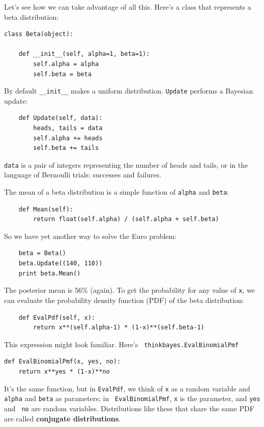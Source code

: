 \documentclass[12pt]{book}
\begin{document}
Let's see how we can take advantage of all this.  Here's
a class that represents a beta distribution:

\begin{verbatim}
class Beta(object):

    def __init__(self, alpha=1, beta=1):
        self.alpha = alpha
        self.beta = beta
\end{verbatim}

By default \verb"__init__" makes a uniform distribution.
{\tt Update} performs a Bayesian update:

\begin{verbatim}
    def Update(self, data):
        heads, tails = data
        self.alpha += heads
        self.beta += tails
\end{verbatim}

{\tt data} is a pair of integers representing the number of
heads and tails, or in the language of Bernoulli trials: successes
and failures.

The mean of a beta distribution is a simple function of {\tt alpha}
and {\tt beta}:

\begin{verbatim}
    def Mean(self):
        return float(self.alpha) / (self.alpha + self.beta)
\end{verbatim}

So we have yet another way to solve the Euro problem:

\begin{verbatim}
    beta = Beta()
    beta.Update((140, 110))
    print beta.Mean()
\end{verbatim}

The posterior mean is 56\% (again).  To get the probability for
any value of {\tt x}, we can evaluate the probability density
function (PDF) of the beta
distribution:

\begin{verbatim}
    def EvalPdf(self, x):
        return x**(self.alpha-1) * (1-x)**(self.beta-1)
\end{verbatim}

This expression might look familiar.  Here's {\tt
  thinkbayes.EvalBinomialPmf}

\begin{verbatim}
def EvalBinomialPmf(x, yes, no): 
    return x**yes * (1-x)**no
\end{verbatim}

It's the same function, but in {\tt EvalPdf}, we think of {\tt x} as a
random variable and {\tt alpha} and {\tt beta} as parameters; in {\tt
  EvalBinomialPmf}, {\tt x} is the parameter, and {\tt yes} and {\tt
  no} are random variables.  Distributions like these that share the
same PDF are called {\bf conjugate distributions}.
\end{document}
